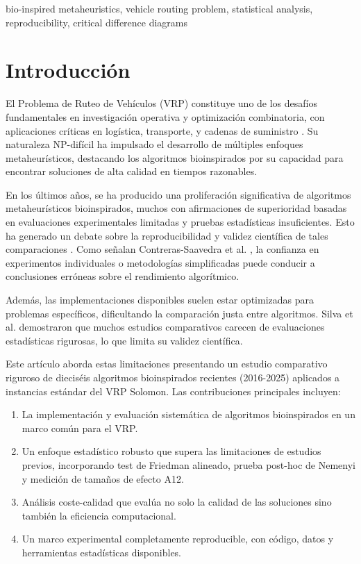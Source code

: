 \documentclass[conference,a4paper]{IEEEtran}
\begin{document}
\begin{IEEEkeywords}
bio-inspired metaheuristics, vehicle routing problem, statistical analysis, reproducibility, critical difference diagrams
\end{IEEEkeywords}


\section{Introducción}\vspace{-0.2cm}
El Problema de Ruteo de Vehículos (VRP) constituye uno de los desafíos fundamentales en investigación operativa y optimización combinatoria, con aplicaciones críticas en logística, transporte, y cadenas de suministro \cite{Mirjalili2016WOA}. Su naturaleza NP-difícil ha impulsado el desarrollo de múltiples enfoques metaheurísticos, destacando los algoritmos bioinspirados por su capacidad para encontrar soluciones de alta calidad en tiempos razonables.

En los últimos años, se ha producido una proliferación significativa de algoritmos metaheurísticos bioinspirados, muchos con afirmaciones de superioridad basadas en evaluaciones experimentales limitadas y pruebas estadísticas insuficientes. Esto ha generado un debate sobre la reproducibilidad y validez científica de tales comparaciones \cite{Li2020SMA}. Como señalan Contreras-Saavedra et al. \cite{Contreras2024CD}, la confianza en experimentos individuales o metodologías simplificadas puede conducir a conclusiones erróneas sobre el rendimiento algorítmico.

Además, las implementaciones disponibles suelen estar optimizadas para problemas específicos, dificultando la comparación justa entre algoritmos. Silva et al. \cite{Silva2023VRP} demostraron que muchos estudios comparativos carecen de evaluaciones estadísticas rigurosas, lo que limita su validez científica.

Este artículo aborda estas limitaciones presentando un estudio comparativo riguroso de dieciséis algoritmos bioinspirados recientes (2016-2025) aplicados a instancias estándar del VRP Solomon. Las contribuciones principales incluyen:

\begin{enumerate}
\item La implementación y evaluación sistemática de algoritmos bioinspirados en un marco común para el VRP.
\item Un enfoque estadístico robusto que supera las limitaciones de estudios previos, incorporando test de Friedman alineado, prueba post-hoc de Nemenyi y medición de tamaños de efecto A12.
\item Análisis coste-calidad que evalúa no solo la calidad de las soluciones sino también la eficiencia computacional.
\item Un marco experimental completamente reproducible, con código, datos y herramientas estadísticas disponibles.
\end{enumerate}
\end{document}
